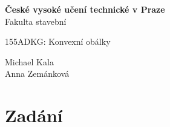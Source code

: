 \documentclass[a4paper, 12pt]{article}
\begin{document}
\begin{titlepage}
\begin{center}
\noindent
\Large \textbf{České vysoké učení technické v Praze }\\ Fakulta stavební
\vspace{5cm}

\huge


\vspace{0.5cm}

155ADKG: Konvexní obálky \\

\vspace{10cm}




\Large
Michael Kala\\
Anna Zemánková \\

\end{center}

\end{titlepage}




\pagestyle{plain}     %
\setcounter{page}{1}  %


\section{Zadání}
\end{document}
